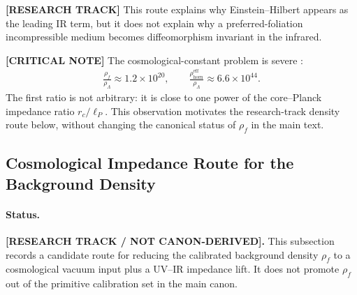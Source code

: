 \textbf{[RESEARCH TRACK]} This route explains why Einstein--Hilbert appears as
the leading IR term, but it does not explain why a preferred-foliation
incompressible medium becomes diffeomorphism invariant in the infrared.

\textbf{[CRITICAL NOTE]} The cosmological-constant problem is severe
\cite{Planck2018Cosmology}:
\begin{align}
    \frac{\rho_{\!f}}{\rho_\Lambda}
    \approx
    1.2\times10^{20},
    \qquad
    \frac{\rho_{\mathrm{horn}}^{\mathrm{eff}}}{\rho_\Lambda}
    \approx
    6.6\times10^{44}.
\end{align}
The first ratio is not arbitrary: it is close to one power of the
core--Planck impedance ratio \(r_c/\ell_P\).  This observation motivates
the research-track density route below, without changing the canonical
status of \(\rho_{\!f}\) in the main text.


\subsection{Cosmological Impedance Route for the Background Density}
\label{sec:rt_rhof_cosmological_impedance_route}

\paragraph{Status.}
\textbf{[RESEARCH TRACK / NOT CANON-DERIVED].}
This subsection records a candidate route for reducing the calibrated
background density \(\rho_{\!f}\) to a cosmological vacuum input plus a
UV--IR impedance lift. It does not promote \(\rho_{\!f}\) out of the
primitive calibration set in the main canon.

